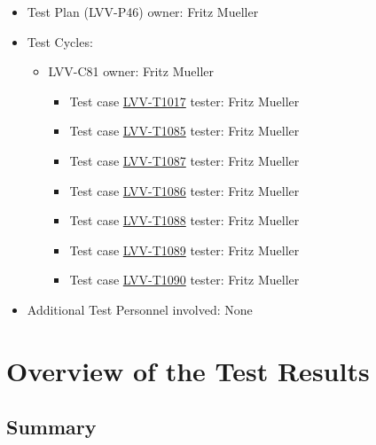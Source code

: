\documentclass[DM,STR,toc]{lsstdoc}
\begin{document}
\begin{itemize}
\item Test Plan (LVV-P46) owner: Fritz Mueller
\item Test Cycles:
\begin{itemize}
  \item LVV-C81 owner: 
    Fritz Mueller
  \begin{itemize}
    \item Test case \href{https://jira.lsstcorp.org/secure/Tests.jspa#/testCase/LVV-T1017}{LVV-T1017} tester: Fritz Mueller
    \item Test case \href{https://jira.lsstcorp.org/secure/Tests.jspa#/testCase/LVV-T1085}{LVV-T1085} tester: Fritz Mueller
    \item Test case \href{https://jira.lsstcorp.org/secure/Tests.jspa#/testCase/LVV-T1087}{LVV-T1087} tester: Fritz Mueller
    \item Test case \href{https://jira.lsstcorp.org/secure/Tests.jspa#/testCase/LVV-T1086}{LVV-T1086} tester: Fritz Mueller
    \item Test case \href{https://jira.lsstcorp.org/secure/Tests.jspa#/testCase/LVV-T1088}{LVV-T1088} tester: Fritz Mueller
    \item Test case \href{https://jira.lsstcorp.org/secure/Tests.jspa#/testCase/LVV-T1089}{LVV-T1089} tester: Fritz Mueller
    \item Test case \href{https://jira.lsstcorp.org/secure/Tests.jspa#/testCase/LVV-T1090}{LVV-T1090} tester: Fritz Mueller
  \end{itemize}
\end{itemize}
\item Additional Test Personnel involved: None
\end{itemize}

\newpage

\section{Overview of the Test Results}
\label{sect:overview}

\subsection{Summary}
\label{sect:summarytable}
\end{document}
